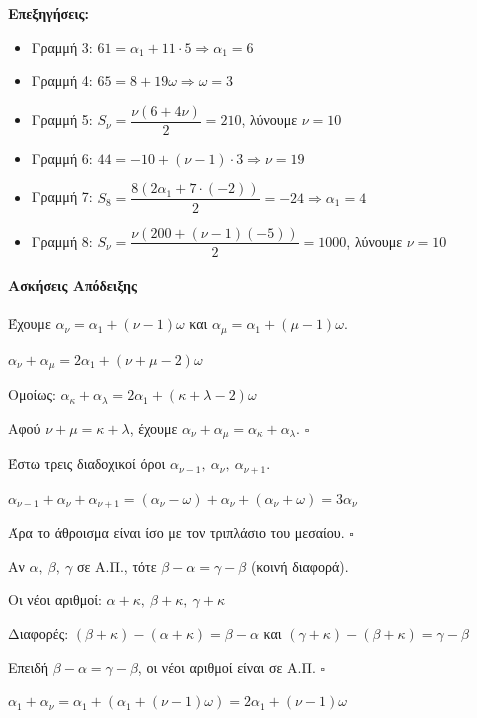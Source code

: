 \documentclass[11pt,a4paper,modern]{FFExercises}
\begin{document}
\textbf{Επεξηγήσεις:}
\begin{itemize}
\item Γραμμή 3: $61=\alpha_1+11\cdot 5 \Rightarrow \alpha_1=6$
\item Γραμμή 4: $65=8+19\omega \Rightarrow \omega=3$
\item Γραμμή 5: $S_{\nu}=\dfrac{\nu(6+4\nu)}{2}=210$, λύνουμε $\nu=10$
\item Γραμμή 6: $44=-10+(\nu-1)\cdot 3 \Rightarrow \nu=19$
\item Γραμμή 7: $S_8=\dfrac{8(2\alpha_1+7\cdot(-2))}{2}=-24 \Rightarrow \alpha_1=4$
\item Γραμμή 8: $S_{\nu}=\dfrac{\nu(200+(\nu-1)(-5))}{2}=1000$, λύνουμε $\nu=10$
\end{itemize}

\paragraph{Ασκήσεις Απόδειξης}

\lysh[44]
Έχουμε $\alpha_{\nu}=\alpha_1+(\nu-1)\omega$ και $\alpha_{\mu}=\alpha_1+(\mu-1)\omega$.

$\alpha_{\nu}+\alpha_{\mu}=2\alpha_1+(\nu+\mu-2)\omega$

Ομοίως: $\alpha_{\kappa}+\alpha_{\lambda}=2\alpha_1+(\kappa+\lambda-2)\omega$

Αφού $\nu+\mu=\kappa+\lambda$, έχουμε $\alpha_{\nu}+\alpha_{\mu}=\alpha_{\kappa}+\alpha_{\lambda}$. \hfill $\square$

\lysh[45]
Έστω τρεις διαδοχικοί όροι $\alpha_{\nu-1},\ \alpha_{\nu},\ \alpha_{\nu+1}$.

$\alpha_{\nu-1}+\alpha_{\nu}+\alpha_{\nu+1}=(\alpha_{\nu}-\omega)+\alpha_{\nu}+(\alpha_{\nu}+\omega)=3\alpha_{\nu}$

Άρα το άθροισμα είναι ίσο με τον τριπλάσιο του μεσαίου. \hfill $\square$

\lysh[46]
Αν $\alpha,\ \beta,\ \gamma$ σε Α.Π., τότε $\beta-\alpha=\gamma-\beta$ (κοινή διαφορά).

Οι νέοι αριθμοί: $\alpha+\kappa,\ \beta+\kappa,\ \gamma+\kappa$

Διαφορές: $(\beta+\kappa)-(\alpha+\kappa)=\beta-\alpha$ και $(\gamma+\kappa)-(\beta+\kappa)=\gamma-\beta$

Επειδή $\beta-\alpha=\gamma-\beta$, οι νέοι αριθμοί είναι σε Α.Π. \hfill $\square$

\lysh[47]
$\alpha_1+\alpha_{\nu}=\alpha_1+(\alpha_1+(\nu-1)\omega)=2\alpha_1+(\nu-1)\omega$
\end{document}
